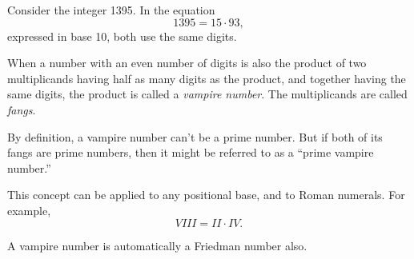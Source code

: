 \documentclass[12pt]{article}
\begin{document}
Consider the integer 1395. In the equation $$1395 = 15 \cdot 93,$$ expressed in base 10, both  use the same digits.

When a number with an even number of digits is also the product of two multiplicands having half as many digits as the product, and together having the same digits, the product is called a {\em vampire number}. The multiplicands are called {\em fangs}.

By definition, a vampire number can't be a prime number. But if both of its fangs are prime numbers, then it might be referred to as a ``prime vampire number.''

This concept can be applied to any positional base, and  to Roman numerals. For example, $$VIII = II \cdot IV.$$

A vampire number is automatically a Friedman number also.
\end{document}
